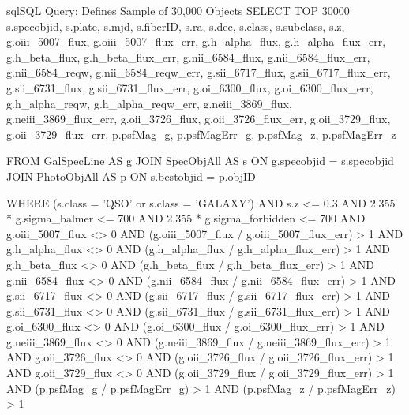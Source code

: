 \documentclass[letterpaper, oneside]{article}
\begin{document}
	\begin{sourcecode}[\label{sdss_query}]{sql}{SQL Query: Defines Sample of 30,000 Objects}
		SELECT TOP 30000 s.specobjid, s.plate, s.mjd, s.fiberID, 
		s.ra, s.dec, s.class, s.subclass, s.z, 
		g.oiii_5007_flux, g.oiii_5007_flux_err, 
		g.h_alpha_flux, g.h_alpha_flux_err, 
		g.h_beta_flux, g.h_beta_flux_err, 
		g.nii_6584_flux, g.nii_6584_flux_err, 
		g.nii_6584_reqw, g.nii_6584_reqw_err, 
		g.sii_6717_flux, g.sii_6717_flux_err, 
		g.sii_6731_flux, g.sii_6731_flux_err, 
		g.oi_6300_flux, g.oi_6300_flux_err, 
		g.h_alpha_reqw, g.h_alpha_reqw_err, 
		g.neiii_3869_flux, g.neiii_3869_flux_err, 
		g.oii_3726_flux, g.oii_3726_flux_err, 
		g.oii_3729_flux, g.oii_3729_flux_err, 
		p.psfMag_g, p.psfMagErr_g, 
		p.psfMag_z, p.psfMagErr_z
		
		FROM GalSpecLine AS g 
		JOIN SpecObjAll AS s ON g.specobjid = s.specobjid
		JOIN PhotoObjAll AS p ON s.bestobjid = p.objID
		
		WHERE
		(s.class = 'QSO' or s.class = 'GALAXY')
		AND s.z <= 0.3
		AND 2.355 * g.sigma_balmer <= 700
		AND 2.355 * g.sigma_forbidden <= 700
		AND g.oiii_5007_flux <> 0
		AND (g.oiii_5007_flux / g.oiii_5007_flux_err) > 1
		AND g.h_alpha_flux <> 0
		AND (g.h_alpha_flux / g.h_alpha_flux_err) > 1
		AND g.h_beta_flux <> 0
		AND (g.h_beta_flux / g.h_beta_flux_err) > 1
		AND g.nii_6584_flux <> 0
		AND (g.nii_6584_flux / g.nii_6584_flux_err) > 1
		AND g.sii_6717_flux <> 0
		AND (g.sii_6717_flux / g.sii_6717_flux_err) > 1
		AND g.sii_6731_flux <> 0
		AND (g.sii_6731_flux / g.sii_6731_flux_err) > 1
		AND g.oi_6300_flux <> 0
		AND (g.oi_6300_flux / g.oi_6300_flux_err) > 1
		AND g.neiii_3869_flux <> 0
		AND (g.neiii_3869_flux / g.neiii_3869_flux_err) > 1
		AND g.oii_3726_flux <> 0
		AND (g.oii_3726_flux / g.oii_3726_flux_err) > 1
		AND g.oii_3729_flux <> 0
		AND (g.oii_3729_flux / g.oii_3729_flux_err) > 1
		AND (p.psfMag_g / p.psfMagErr_g) > 1
		AND (p.psfMag_z / p.psfMagErr_z) > 1
	\end{sourcecode}
	
\end{document}

